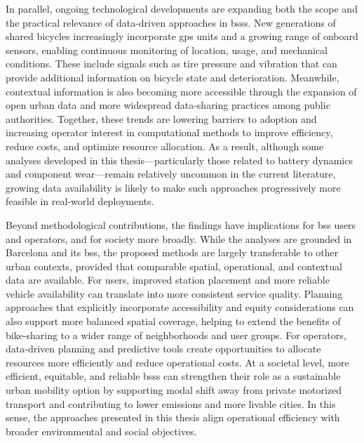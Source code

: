 In parallel, ongoing technological developments are expanding both the scope and the practical relevance of data-driven approaches in \acp{bss}. New generations of shared bicycles increasingly incorporate \ac{gps} units and a growing range of onboard sensors, enabling continuous monitoring of location, usage, and mechanical conditions. These include signals such as tire pressure and vibration that can provide additional information on bicycle state and deterioration. Meanwhile, contextual information is also becoming more accessible through the expansion of open urban data and more widespread data-sharing practices among public authorities. Together, these trends are lowering barriers to adoption and increasing operator interest in computational methods to improve efficiency, reduce costs, and optimize resource allocation. As a result, although some analyses developed in this thesis—particularly those related to battery dynamics and component wear—remain relatively uncommon in the current literature, growing data availability is likely to make such approaches progressively more feasible in real-world deployments.

Beyond methodological contributions, the findings have implications for \ac{bss} users and operators, and for society more broadly. While the analyses are grounded in Barcelona and its \ac{bss}, the proposed methods are largely transferable to other urban contexts, provided that comparable spatial, operational, and contextual data are available. For users, improved station placement and more reliable vehicle availability can translate into more consistent service quality. Planning approaches that explicitly incorporate accessibility and equity considerations can also support more balanced spatial coverage, helping to extend the benefits of bike-sharing to a wider range of neighborhoods and user groups. For operators, data-driven planning and predictive tools create opportunities to allocate resources more efficiently and reduce operational costs. At a societal level, more efficient, equitable, and reliable \acp{bss} can strengthen their role as a sustainable urban mobility option by supporting modal shift away from private motorized transport and contributing to lower emissions and more livable cities. In this sense, the approaches presented in this thesis align operational efficiency with broader environmental and social objectives.


